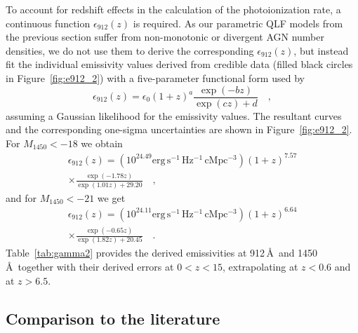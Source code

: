 \documentclass[fleqn,usenatbib]{mnras}
\begin{document}
To account for redshift effects in the calculation of the  photoionization rate,
a continuous function $\epsilon_{912}\left(z\right)$ is required. As our parametric QLF models
from the previous section suffer from non-monotonic or divergent AGN number densities,
we do not use them to derive the corresponding $\epsilon_{912}\left(z\right)$, but
instead fit the individual emissivity values derived from credible data
(filled black circles in Figure~\ref{fig:e912_2}) with a 
five-parameter functional form used by \citet{2012ApJ...746..125H}
\begin{equation}
  \epsilon_{912}\left(z\right)=\epsilon_0(1+z)^a\frac{\exp(-bz)}{\exp(cz)+d}\quad,
  \label{eqn:e912fit}
\end{equation}
assuming a Gaussian likelihood for the emissivity values.  The
resultant curves and the corresponding one-sigma uncertainties are
shown in Figure~\ref{fig:e912_2}. For $M_{1450}<-18$ we obtain
\begin{multline}
  \epsilon_{912}\left(z\right)=\left(10^{24.49}\mathrm{erg\, s^{-1}\, Hz^{-1}\, cMpc^{-3}}\right)\left(1+z\right)^{7.57}\\\times\frac{\exp(-1.78z)}{\exp(1.01z)+29.20}\quad,
  \label{eqn:e912_18}
\end{multline}
 and for $M_{1450}<-21$ we get
\begin{multline}
  \epsilon_{912}\left(z\right)=\left(10^{24.11}\mathrm{erg\, s^{-1}\, Hz^{-1}\, cMpc^{-3}}\right)\left(1+z\right)^{6.64}\\\times\frac{\exp(-0.65z)}{\exp(1.82z)+20.45}\quad.
  \label{eqn:e912_21}
\end{multline}
Table~\ref{tab:gamma2} provides the derived emissivities at
912\,\AA\ and 1450\,\AA\ together with their derived errors at
$0<z<15$, extrapolating at $z<0.6$ and at $z>6.5$.

\subsection{Comparison to the literature}
\end{document}
